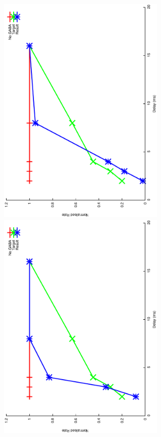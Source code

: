 \documentclass{article}
\begin{document}
\includegraphics[keepaspectratio=true,angle=-90,width=0.6\textwidth]{DS_ClickRecovery_result.10.eps}\clearpage
\includegraphics[keepaspectratio=true,angle=-90,width=0.6\textwidth]{DS_ClickRecovery_result.11.eps}\clearpage
\end{document}
